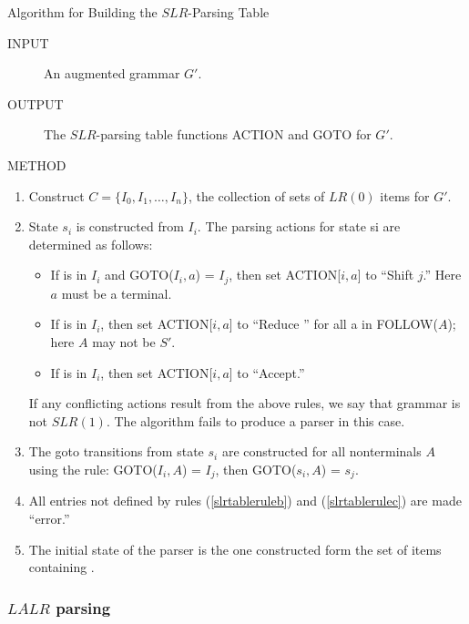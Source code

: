 \begin{bibunit}[apalike]
\begin{frame}[allowframebreaks]{Algorithm for Building the $SLR$-Parsing Table}
	\begin{description}
	\item[INPUT] An augmented grammar $G'$.
	\item[OUTPUT] The $SLR$-parsing table functions ACTION and GOTO for $G'$.
	\item[METHOD]
	\end{description}
	\begin{enumerate}
	\item\label{slrtablerulea}Construct $C = \{ I_0, I_1, \dots , I_n \}$, the collection of sets of $LR(0)$ items for $G'$.
	\item\label{slrtableruleb}State $s_i$ is constructed from $I_i$. The parsing actions for state si are determined as follows:
		\begin{itemize}
		\item If  is in $I_i$ and GOTO($I_i,a$) = $I_j$, then set ACTION[$i,a$] to ``Shift $j$.'' Here $a$ must be a terminal.
		\item If  is in $I_i$, then set ACTION[$i,a$] to ``Reduce '' for all a in FOLLOW($A$); here $A$ may not be $S'$.
		\item If  is in $I_i$, then set ACTION[$i,a$] to ``Accept.''
		\end{itemize}
		If any conflicting actions result from the above rules, we say that grammar is not $SLR(1)$. The algorithm fails to produce a parser in this case.
	\item\label{slrtablerulec}The goto transitions from state $s_i$ are constructed for all nonterminals $A$ using the rule:  GOTO($I_i,A$) = $I_j$, then GOTO($s_i,A$) = $s_j$.
	\item All entries not defined by rules (\ref{slrtableruleb}) and (\ref{slrtablerulec}) are made ``error.''
	\item The initial state of the parser is the one constructed form the set of items containing .
	\end{enumerate}
\end{frame}

\subsubsection{$LALR$ parsing}


\end{bibunit}
